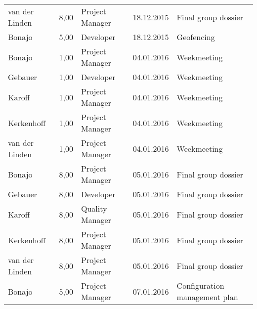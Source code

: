 \begin{longtable}{ l r p{2cm} c p{4cm} }
		van der Linden          & 8,00           & Project Manager & 18.12.2015    & Final group dossier                                                             \\
		Bonajo                  & 5,00           & Developer       & 18.12.2015    & Geofencing                                                                      \\
		Bonajo                  & 1,00           & Project Manager & 04.01.2016    & Weekmeeting                                                                     \\
		Gebauer                 & 1,00           & Developer       & 04.01.2016    & Weekmeeting                                                                     \\
		Karoff                  & 1,00           & Project Manager & 04.01.2016    & Weekmeeting                                                                     \\
		Kerkenhoff              & 1,00           & Project Manager & 04.01.2016    & Weekmeeting                                                                     \\
		van der Linden          & 1,00           & Project Manager & 04.01.2016    & Weekmeeting                                                                     \\
		Bonajo                  & 8,00           & Project Manager & 05.01.2016    & Final group dossier                                                             \\
		Gebauer                 & 8,00           & Developer       & 05.01.2016    & Final group dossier                                                             \\
		Karoff                  & 8,00           & Quality Manager & 05.01.2016    & Final group dossier                                                             \\
		Kerkenhoff              & 8,00           & Project Manager & 05.01.2016    & Final group dossier                                                             \\
		van der Linden          & 8,00           & Project Manager & 05.01.2016    & Final group dossier                                                             \\
		Bonajo                  & 5,00           & Project Manager & 07.01.2016    & Configuration management plan                                                   \\

\end{longtable}
